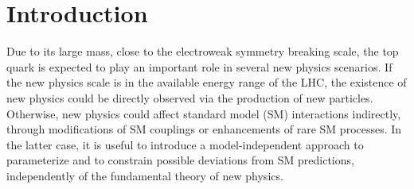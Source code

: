 \section{Introduction}
\label{tW_Int}

Due to its large mass, close to the electroweak symmetry breaking scale,
the top quark is expected to play an important role in several new physics scenarios.
If the new physics scale is in the available energy range of the LHC, the existence of new
physics could be directly observed via the production of new particles. Otherwise,
new physics could affect standard model (SM) interactions indirectly,
through modifications of SM couplings or enhancements of rare SM processes.
In the latter case, it is useful to introduce a model-independent approach to parameterize and to
constrain possible deviations from SM predictions, independently of the fundamental theory of new physics.

